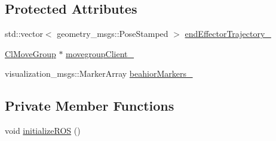 \subsection*{Protected Attributes}
\begin{DoxyCompactItemize}
\item 
std\+::vector$<$ geometry\+\_\+msgs\+::\+Pose\+Stamped $>$ \hyperlink{classcl__move__group__interface_1_1CbMoveEndEffectorTrajectory_ae13dfd31ea3660646e03882f0c2c29f0}{end\+Effector\+Trajectory\+\_\+}
\item 
\hyperlink{classcl__move__group__interface_1_1ClMoveGroup}{Cl\+Move\+Group} $\ast$ \hyperlink{classcl__move__group__interface_1_1CbMoveEndEffectorTrajectory_aea650d3e7836125b32be97392b71a7f3}{movegroup\+Client\+\_\+}
\item 
visualization\+\_\+msgs\+::\+Marker\+Array \hyperlink{classcl__move__group__interface_1_1CbMoveEndEffectorTrajectory_a809fb5385adf27c0a1c8f8136566949c}{beahior\+Markers\+\_\+}
\end{DoxyCompactItemize}
\subsection*{Private Member Functions}
\begin{DoxyCompactItemize}
\item 
void \hyperlink{classcl__move__group__interface_1_1CbMoveEndEffectorTrajectory_afcee8f3853a5cef8806137a304c8a14b}{initialize\+R\+OS} ()
\end{DoxyCompactItemize}

